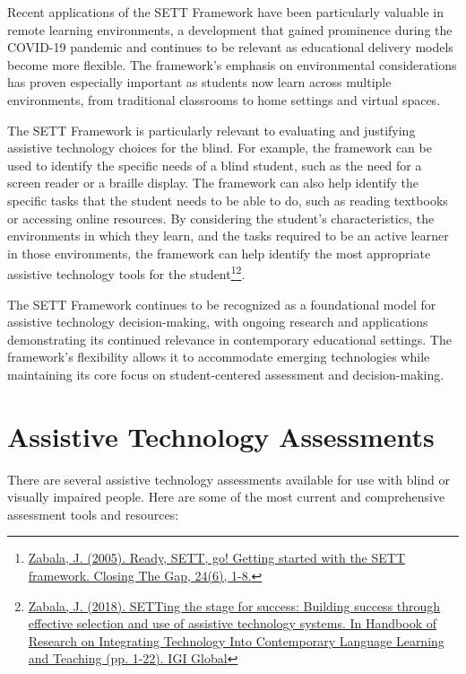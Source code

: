 Recent applications of the SETT Framework have been particularly valuable in remote learning environments, a development that gained prominence during the COVID-19 pandemic and continues to be relevant as educational delivery models become more flexible. The framework's emphasis on environmental considerations has proven especially important as students now learn across multiple environments, from traditional classrooms to home settings and virtual spaces.

The SETT Framework is particularly relevant to evaluating and justifying assistive technology choices for the blind. For example, the framework can be used to identify the specific needs of a blind student, such as the need for a screen reader or a braille display. The framework can also help identify the specific tasks that the student needs to be able to do, such as reading textbooks or accessing online resources. By considering the student's characteristics, the environments in which they learn, and the tasks required to be an active learner in those environments, the framework can help identify the most appropriate assistive technology tools for the student\footnote{\raggedright \href{https://www.joyzabala.com/uploads/1/0/9/0/109073507/ready_sett_go.pdf}{Zabala, J. (2005). Ready, SETT, go! Getting started with the SETT framework. Closing The Gap, 24(6), 1-8.}}\footnote{\raggedright \href{https://www.researchgate.net/profile/Joy-Zabala/publication/237798275_SETTing_the_Stage_for_Success_Building_Success_through_Effective_Selection_and_Use_of_Assistive_Technology_Systems/links/56452b9208aef646e6cc24d9/SETTing-the-Stage-for-Success-Building-Success-through-Effective-Selection-and-Use-of-Assistive-Technology-Systems.pdf?origin=publication_detail}{Zabala, J. (2018). SETTing the stage for success: Building success through effective selection and use of assistive technology systems. In Handbook of Research on Integrating Technology Into Contemporary Language Learning and Teaching (pp. 1-22). IGI Global}}.

The SETT Framework continues to be recognized as a foundational model for assistive technology decision-making, with ongoing research and applications demonstrating its continued relevance in contemporary educational settings. The framework's flexibility allows it to accommodate emerging technologies while maintaining its core focus on student-centered assessment and decision-making.

\section{Assistive Technology Assessments}\label{trouble4}
There are several assistive technology assessments available for use with blind or visually impaired people. Here are some of the most current and comprehensive assessment tools and resources:

